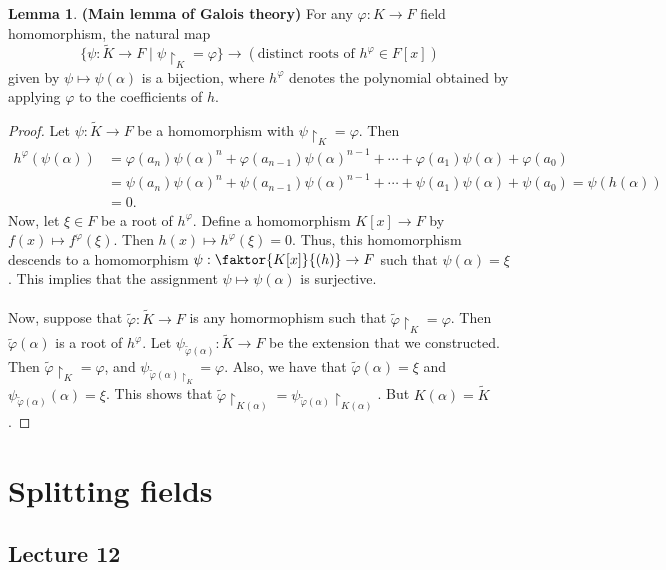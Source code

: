 \documentclass[10pt,letterpaper,cm]{nupset}
\theoremstyle{definition}
\newtheorem{lemma}{Lemma}
\newcommand{\1}{\mathbf{1}}
\newcommand{\0}{\vec 0}
\begin{document}
\begin{lemma}{\textbf{(Main lemma of Galois theory)}}
For any $\varphi : K \to F$ field homomorphism, the natural map $$\{\psi : \widetilde{K} \to F \mid \psi \restriction_K = \varphi \} \to (\text{distinct roots of } h^{\varphi} \in F[x])$$ given by $ \psi \mapsto \psi(\alpha)$ is a bijection, where $h^{\varphi}$ denotes the polynomial obtained by applying $\varphi$ to the coefficients of $h$. 
\end{lemma}
\begin{proof}
Let $\psi : \widetilde{K} \to F$ be a homomorphism with $\psi \restriction_K = \varphi$. Then 
\begin{align*}
h^{\varphi}(\psi(\alpha)) & = \varphi(a_n)\psi(\alpha)^n + \varphi(a_{n-1})\psi(\alpha)^{n-1} + \cdots + \varphi(a_1) \psi(\alpha) + \varphi(a_0) 
\\ & = \psi(a_n)\psi(\alpha)^n + \psi(a_{n-1})\psi(\alpha)^{n-1} + \cdots + \psi(a_1)\psi(\alpha) + \psi(a_0) = \psi(h(\alpha)) 
\\ &= 0.
\end{align*}  Now, let $\xi \in F$ be a root of $h^{\varphi}$. Define a homomorphism $K[x] \to F$ by $f(x) \mapsto f^{\varphi}(\xi)$. Then $h(x) \mapsto h^{\varphi}(\xi)=0$. Thus, this homomorphism descends to a homomorphism $\psi : \faktor{K[x]}{(h)} \to F$ such that $\psi(\alpha) = \xi$. This implies that the assignment $\psi \mapsto \psi(\alpha)$ is surjective.
\\ \\
Now, suppose that $\tilde{\varphi} : \widetilde{K} \to F$ is any homormophism such that $\tilde{\varphi}\restriction_K = \varphi$. Then $\tilde{\varphi}(\alpha)$ is a root of $h^{\varphi}$. Let $\psi_{\tilde{\varphi}(\alpha)} : \widetilde{K} \to F$ be the extension that we constructed. Then $\tilde{\varphi}\restriction_K = \varphi$, and $\psi_{\tilde{\varphi}(\alpha)\restriction_K} = \varphi$. Also, we have that $\tilde{\varphi}(\alpha) = \xi$ and $\psi_{\tilde{\varphi}(\alpha)}(\alpha) = \xi$. This shows that $\tilde{\varphi}\restriction_{K(\alpha)} = \psi_{\tilde{\varphi}(\alpha)} \restriction_{K(\alpha)}$. But $K(\alpha) = \widetilde{K}$.
\end{proof}

\section{Splitting fields}

\subsection{Lecture 12}
\end{document}
